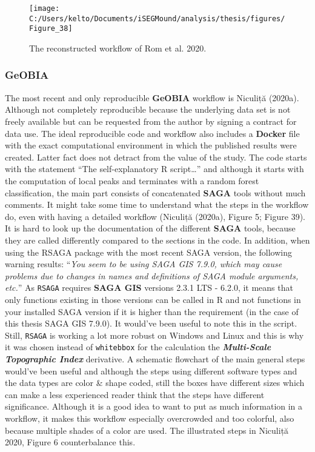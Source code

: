 \documentclass[
  12pt,
]{article}
\begin{document}
\begin{figure}

{\centering \texttt{[image: C:/Users/kelto/Documents/iSEGMound/analysis/thesis/figures/Figure\_38]} 

}

\caption{The reconstructed workflow of Rom et al. 2020.}\label{fig:Figure38}
\end{figure}

\hypertarget{geobia}{%
\subsubsection{\texorpdfstring{\textbf{GeOBIA}}{GeOBIA}}\label{geobia}}

The most recent and only reproducible \textbf{GeOBIA} workflow is Niculiță (2020a). Although not completely reproducible because the underlying data set is not freely available but can be requested from the author by signing a contract for data use. The ideal reproducible code and workflow also includes a \textbf{Docker} file with the exact computational environment in which the published results were created. Latter fact does not detract from the value of the study.
The code starts with the statement ``The self-explanatory R script\ldots{}'' and although it starts with the computation of local peaks and terminates with a random forest classification, the main part consists of concatenated \textbf{SAGA} tools without much comments. It might take some time to understand what the steps in the workflow do, even with having a detailed workflow (Niculiță (2020a), Figure 5; Figure 39). It is hard to look up the documentation of the different \textbf{SAGA} tools, because they are called differently compared to the sections in the code. In addition, when using the RSAGA package with the most recent SAGA version, the following warning results: ``\emph{You seem to be using SAGA GIS 7.9.0, which may cause problems due to changes in names and definitions of SAGA module arguments, etc.}'' As \texttt{RSAGA} requires \textbf{SAGA GIS} versions 2.3.1 LTS - 6.2.0, it means that only functions existing in those versions can be called in R and not functions in your installed SAGA version if it is higher than the requirement (in the case of this thesis SAGA GIS 7.9.0). It would've been useful to note this in the script. Still, \texttt{RSAGA} is working a lot more robust on Windows and Linux and this is why it was chosen instead of \texttt{whitebbox} for the calculation the \textbf{\emph{Multi-Scale Topographic Index}} derivative.
A schematic flowchart of the main general steps would've been useful and although the steps using different software types and the data types are color \& shape coded, still the boxes have different sizes which can make a less experienced reader think that the steps have different significance. Although it is a good idea to want to put as much information in a workflow, it makes this workflow especially overcrowded and too colorful, also because multiple shades of a color are used. The illustrated steps in Niculiță 2020, Figure 6 counterbalance this.
\end{document}
